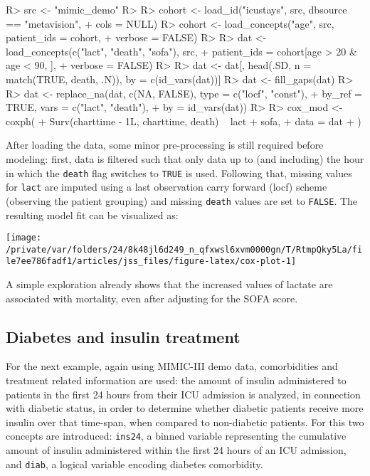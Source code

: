 \documentclass[
  notitle]{jss}
\begin{document}
\begin{CodeChunk}
\begin{CodeInput}
R> src <- "mimic_demo"
R> 
R> cohort <- load_id("icustays", src, dbsource == "metavision",
+                   cols = NULL)
R> cohort <- load_concepts("age", src, patient_ids = cohort,
+                         verbose = FALSE)
R> 
R> dat <- load_concepts(c("lact", "death", "sofa"), src,
+                      patient_ids = cohort[age > 20 & age < 90, ],
+                      verbose = FALSE)
R> 
R> dat <- dat[, head(.SD, n = match(TRUE, death, .N)), by = c(id_vars(dat))]
R> dat <- fill_gaps(dat)
R> 
R> dat <- replace_na(dat, c(NA, FALSE), type = c("locf", "const"),
+                   by_ref = TRUE, vars = c("lact", "death"),
+                   by = id_vars(dat))
R> 
R> cox_mod <- coxph(
+   Surv(charttime - 1L, charttime, death) ~ lact + sofa,
+   data = dat
+ )
\end{CodeInput}
\end{CodeChunk}

After loading the data, some minor pre-processing is still required
before modeling: first, data is filtered such that only data up to (and
including) the hour in which the \texttt{death} flag switches to
\texttt{TRUE} is used. Following that, missing values for \texttt{lact}
are imputed using a last observation carry forward (locf) scheme
(observing the patient grouping) and missing \texttt{death} values are
set to \texttt{FALSE}. The resulting model fit can be visualized as:

\begin{CodeChunk}


\begin{center}\texttt{[image: /private/var/folders/24/8k48jl6d249\_n\_qfxwsl6xvm0000gn/T/RtmpQky5La/file7ee786fadf1/articles/jss\_files/figure-latex/cox-plot-1]} \end{center}

\end{CodeChunk}

A simple exploration already shows that the increased values of lactate
are associated with mortality, even after adjusting for the SOFA score.

\hypertarget{diabetes-and-insulin-treatment}{%
\subsection{Diabetes and insulin
treatment}\label{diabetes-and-insulin-treatment}}

For the next example, again using MIMIC-III demo data, comorbidities and
treatment related information are used: the amount of insulin
administered to patients in the first 24 hours from their ICU admission
is analyzed, in connection with diabetic status, in order to determine
whether diabetic patients receive more insulin over that time-span, when
compared to non-diabetic patients. For this two concepts are introduced:
\texttt{ins24}, a binned variable representing the cumulative amount of
insulin administered within the first 24 hours of an ICU admission, and
\texttt{diab}, a logical variable encoding diabetes comorbidity.
\end{document}
